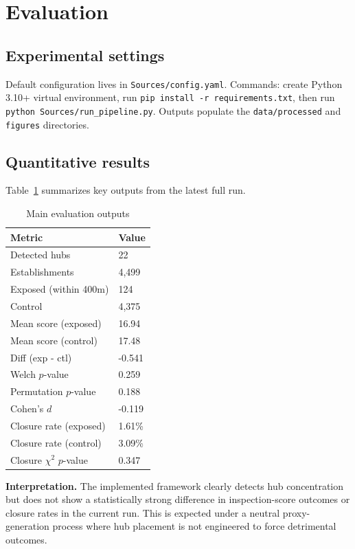 \documentclass[10pt,twocolumn]{article}
\begin{document}
\section{Evaluation}

\subsection{Experimental settings}
Default configuration lives in \texttt{Sources/config.yaml}. Commands: create Python 3.10+ virtual environment, run \texttt{pip install -r requirements.txt}, then run \texttt{python Sources/run\_pipeline.py}. Outputs populate the \texttt{data/processed} and \texttt{figures} directories.

\subsection{Quantitative results}
Table~\ref{tab:main} summarizes key outputs from the latest full run.

\begin{table}[t]
\centering
\caption{Main evaluation outputs}
\label{tab:main}
\begin{tabular}{@{}ll@{}}
\toprule
Metric & Value \\
\midrule
Detected hubs & 22 \\
Establishments & 4,499 \\
Exposed (within 400m) & 124 \\
Control & 4,375 \\
Mean score (exposed) & 16.94 \\
Mean score (control) & 17.48 \\
Diff (exp - ctl) & -0.541 \\
Welch $p$-value & 0.259 \\
Permutation $p$-value & 0.188 \\
Cohen's $d$ & -0.119 \\
Closure rate (exposed) & 1.61\% \\
Closure rate (control) & 3.09\% \\
Closure $\chi^2$ $p$-value & 0.347 \\
\bottomrule
\end{tabular}
\end{table}

\textbf{Interpretation.} The implemented framework clearly detects hub concentration but does not show a statistically strong difference in inspection-score outcomes or closure rates in the current run. This is expected under a neutral proxy-generation process where hub placement is not engineered to force detrimental outcomes.
\end{document}
